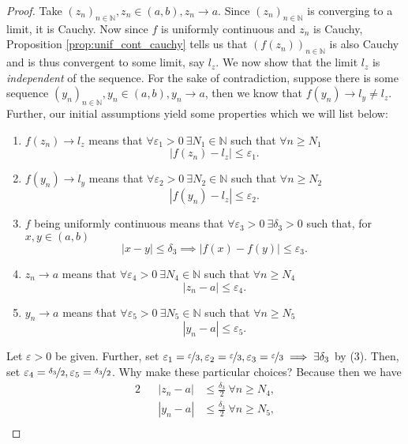 \documentclass{article}
\newcommand{\N}{\mathbb{N}}
\newcommand{\seq}[2]{(#1_{#2})_{#2 \in \N}}
\newcommand{\?}{\stackrel{?}{=}}
\theoremstyle{definition} %
\begin{document}
\begin{itemize}
\begin{proof}
              Take $\seq{z}{n}, z_n \in (a, b), z_n \rightarrow a$. Since $\seq{z}{n}$ is converging to a limit, it is Cauchy. Now since $f$ is uniformly continuous and $z_n$ is Cauchy, Proposition \ref{prop:unif_cont_cauchy} tells us that $(f(z_n))_{n \in \N}$ is also Cauchy and is thus convergent to some limit, say $l_z$. We now show that the limit $l_z$ is \textit{independent} of the sequence. For the sake of contradiction, suppose there is some sequence $\seq{y}{n}, y_n \in (a, b), y_n \rightarrow a$, then we know that $f(y_n) \rightarrow l_y \neq l_z$. Further, our initial assumptions yield some properties which we will list below:
              \begin{enumerate}[label=(\arabic*)]
                  \item $f(z_n) \rightarrow l_z$ means that $\forall \varepsilon_1 > 0 \ \exists N_1 \in \N$ such that $\forall n \geq N_1$
                  $$|f(z_n) - l_z| \leq \varepsilon_1.$$
                  \item $f(y_n) \rightarrow l_y$ means that $\forall \varepsilon_2 > 0 \ \exists N_2 \in \N$ such that $\forall n \geq N_2$
                  $$|f(y_n) - l_z| \leq \varepsilon_2.$$
                  \item $f$ being uniformly continuous means that $\forall \varepsilon_3 > 0 \ \exists \delta_3 > 0$ such that, for $x, y \in (a, b)$
                  $$|x - y| \leq \delta_3 \implies |f(x) - f(y)| \leq \varepsilon_3.$$
                  \item $z_n \rightarrow a$ means that $\forall \varepsilon_4 > 0 \ \exists N_4 \in \N$ such that $\forall n \geq N_4$
                  $$|z_n - a| \leq \varepsilon_4.$$
                  \item $y_n \rightarrow a$ means that $\forall \varepsilon_5 > 0 \ \exists N_5 \in \N$ such that $\forall n \geq N_5$
                  $$|y_n - a| \leq \varepsilon_5.$$
              \end{enumerate}
              Let $\varepsilon > 0$ be given. Further, set $\varepsilon_1 = \nicefrac{\varepsilon}{3}, \varepsilon_2 = \nicefrac{\varepsilon}{3}, \varepsilon_3 = \nicefrac{\varepsilon}{3} \implies \exists \delta_3$ by (3). Then, set $\varepsilon_4 = \nicefrac{\delta_3}{2}, \varepsilon_5 = \nicefrac{\delta_3}{2}$. Why make these particular choices? Because then we have
              \begin{alignat*}{2}
                  &&|z_n - a| &\leq \frac{\delta_3}{2} \ \forall n \geq N_4, \tag{by (4)} \\
                  &&|y_n - a| &\leq \frac{\delta_3}{2} \ \forall n \geq N_5, \tag{by (5)} \\

\end{alignat*}
\end{proof}
\end{itemize}
\end{document}
